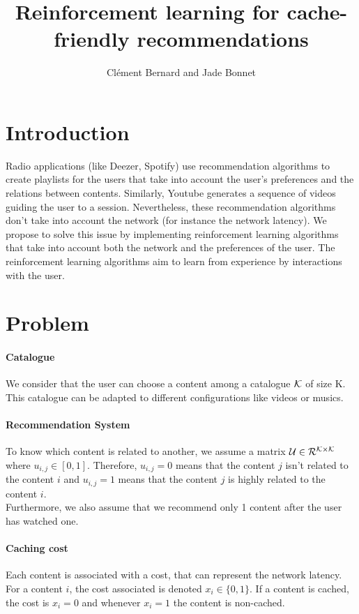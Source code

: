 \documentclass[a4paper]{article}
\title{Reinforcement learning for cache-friendly recommendations}
\author{Clément Bernard and Jade Bonnet }
\begin{document}
\maketitle
\tableofcontents


\newpage 




\section{Introduction}

Radio applications (like Deezer, Spotify) use recommendation algorithms to create playlists for the users that take into account the user's preferences and the relations between contents. Similarly, Youtube generates a sequence of videos guiding the user to a session. Nevertheless, these recommendation algorithms don't take into account the network (for instance the network latency).
We propose to solve this issue by implementing reinforcement learning algorithms that take into account both the network and the preferences of the user. The reinforcement learning algorithms aim to learn from experience by interactions with the user. 


\section{Problem}

\paragraph{Catalogue} We consider that the user can choose a content among a catalogue $\cal{K}$ of size K. This catalogue can be adapted to different configurations like videos or musics. 
\paragraph{Recommendation System} To know which content is related to another, we assume a matrix $\cal{U} \in \cal{R}^{K \times K} $ where $u_{i,j} \in [0,1]$. Therefore, $u_{i,j} = 0$ means that the content $j$ isn't related to the content $i$ and $u_{i,j} = 1$ means that the content $j$ is highly related to the content $i$. \\
Furthermore, we also assume that we recommend only 1 content after the user has watched one.
\paragraph{Caching cost} Each content is associated with a cost, that can represent the network latency. For a content $i$, the cost associated is denoted $x_i \in \{0,1\}$. If a content is cached, the cost is $x_i = 0$ and whenever $x_i = 1$ the content is non-cached. 
\end{document}
